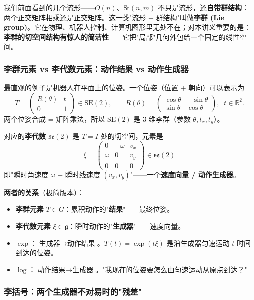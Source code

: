 \documentclass[11pt,a4paper]{article}
\theoremstyle{mythm}
\theoremstyle{mydef}
\newcommand{\R}{\mathbb{R}}
\begin{document}
我们前面看到的几个流形——$O(n)$、$\mathrm{St}(n,m)$ 不只是流形，还\textbf{自带群结构}：两个正交矩阵相乘还是正交矩阵。这一类"流形 + 群结构"叫做\textbf{李群 (Lie group)}。它在物理、机器人控制、计算机图形里无处不在；对本讲义重要的是：\textbf{李群的切空间结构有惊人的简洁性}——它把"局部"几何外包给一个固定的线性空间。

\subsubsection*{李群元素 vs 李代数元素：动作结果 vs 动作生成器}

最直观的例子是机器人在平面上的位姿。一个位姿（位置 + 朝向）可以表示为
$$T = \begin{pmatrix}R(\theta) & t\\ 0 & 1\end{pmatrix}\in \mathrm{SE}(2),\qquad R(\theta) = \begin{pmatrix}\cos\theta & -\sin\theta\\ \sin\theta & \cos\theta\end{pmatrix},\;\; t\in\R^2.$$
两个位姿合成 = 矩阵乘法，所以 $\mathrm{SE}(2)$ 是 3 维李群（参数 $\theta, t_x, t_y$）。

对应的\textbf{李代数 $\mathfrak{se}(2)$} 是 $T = I$ 处的切空间，元素是
$$\xi = \begin{pmatrix}0 & -\omega & v_x\\ \omega & 0 & v_y\\ 0 & 0 & 0\end{pmatrix}\in \mathfrak{se}(2)$$
即"瞬时角速度 $\omega$ + 瞬时线速度 $(v_x, v_y)$"——一个\textbf{速度向量 / 动作生成器}。

\textbf{两者的关系}（极简版本）：
\begin{itemize}[leftmargin=2em]
\item \textbf{李群元素} $T \in G$：累积动作的"\textbf{结果}"——最终位姿。
\item \textbf{李代数元素} $\xi \in \mathfrak{g}$：瞬时动作的"\textbf{生成器}"——速度向量。
\item \textbf{$\exp$}：$\boxed{\text{生成器} \to \text{动作结果}}$。$T(t) = \exp(t\xi)$ 是沿生成器匀速运动 $t$ 时间到达的位姿。
\item \textbf{$\log$}：$\boxed{\text{动作结果} \to \text{生成器}}$。"我现在的位姿要怎么由匀速运动从原点到达？"
\end{itemize}

\subsubsection*{李括号：两个生成器不对易时的"残差"}
\end{document}
